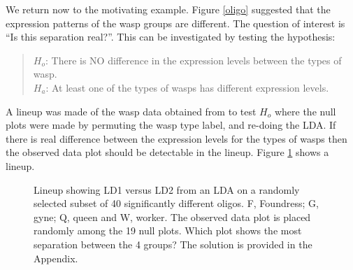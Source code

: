 
We return now to the motivating example. Figure \ref{oligo} suggested that the expression patterns of the wasp groups are different.  The question of interest is ``Is this separation real?''. This can be investigated by testing the hypothesis: 

\begin{quote}
$H_o$: There is NO difference in the expression levels between the types of wasp.\\
$H_a$: At least one of the types of wasps has different expression levels.
\end{quote}
A lineup was made of the wasp data obtained from \cite{toth:2010} to test $H_o$ where the null plots were made by permuting the wasp type label, and re-doing the LDA. If there is real difference between the expression levels for the types of wasps then the observed data plot should be detectable in the lineup. Figure \ref{toth_lineup} shows a lineup. 

\begin{figure}[hbtp]
   \centering
       \caption{Lineup showing LD1 versus LD2 from an LDA on a randomly selected subset of 40 significantly different oligos. F, Foundress; G, gyne; Q, queen and W, worker. The observed data plot is placed randomly among the 19 null plots. Which plot shows the most separation between the 4 groups? The solution is provided in the Appendix.}
       \label{toth_lineup}
\end{figure} 

